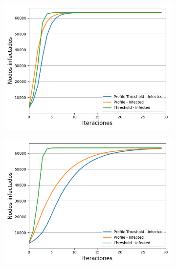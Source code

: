 \documentclass{article}
\begin{document}
\begin{figure}[!tbp]
\begin{subfigure}[b]{0.5\textwidth}
		\includegraphics[width=\textwidth, height=\textwidth]{../Images/Fig 4 b).png}
		\caption{}
		\label{fig:f42}
	\end{subfigure}
	\begin{subfigure}[b]{0.5\textwidth}
		\includegraphics[width=\textwidth, height=\textwidth]{../Images/Fig 4 c).png}

\end{subfigure}
\end{figure}
\end{document}
